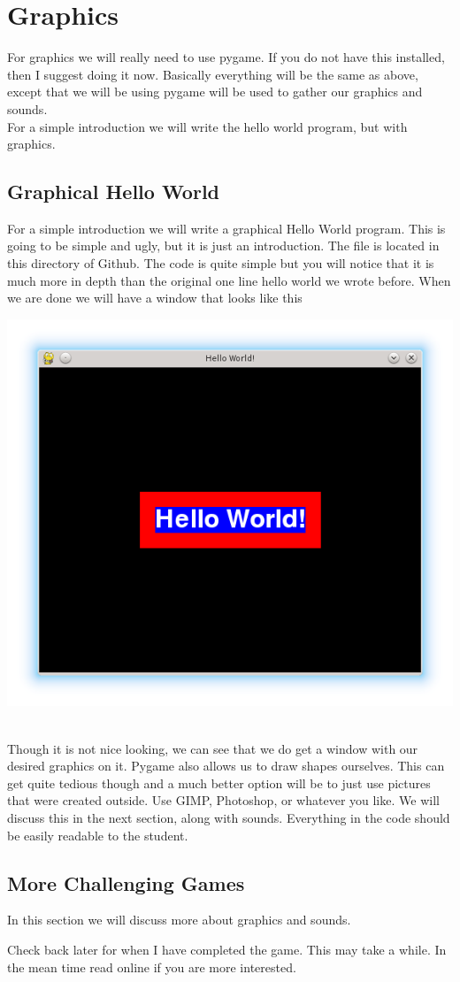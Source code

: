 \documentclass[11pt]{article}   %
\begin{document}
\section*{Graphics}
For graphics we will really need to use pygame.  If you do not have this installed, then I suggest doing it now.  
Basically everything will be the same as above, except that we will be using pygame will be used to gather our 
graphics and sounds.  
\\
For a simple introduction we will write the hello world program, but with graphics.

\subsection*{Graphical Hello World}
For a simple introduction we will write a graphical Hello World program.  This is going to be simple and ugly, but
it is just an introduction.  The file is located in this directory of Github.  The code is quite simple but you 
will notice that it is much more in depth than the original one line hello world we wrote before.  When we are done
we will have a window that looks like this
\\
\begin{center}
   \includegraphics[scale=0.5]{HelloWorld.png}
\end{center}
\\
Though it is not nice looking, we can see that we do get a window with our desired graphics on it.  Pygame also 
allows us to draw shapes ourselves.  This can get quite tedious though and a much better option will be to 
just use pictures that were created outside.  Use GIMP, Photoshop, or whatever you like.  We will discuss this in
the next section, along with sounds.  Everything in the code should be easily readable to the student.

\subsection*{More Challenging Games}
In this section we will discuss more about graphics and sounds.


Check back later for when I have completed the game.  This may take a while.  In the mean time read online if you
are more interested.
\end{document}
